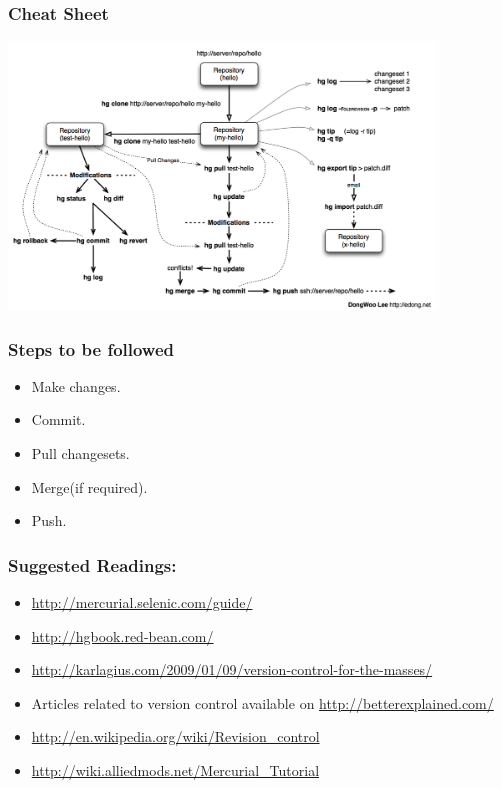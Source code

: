 \documentclass[14pt,compress]{beamer}
\newcounter{time}
\newcommand{\inctime}[1]{\addtocounter{time}{#1}{\tiny \thetime\ m}}
\begin{document}
\begin{frame}
  \frametitle{Cheat Sheet}
  \begin{center}
  \includegraphics[height=2.8in]{mod}  
  \end{center}  
\end{frame}

\begin{frame}
  \frametitle{Steps to be followed}
  \begin{itemize}
  \item Make changes.
  \item Commit.
  \item Pull changesets.
  \item Merge(if required).
  \item Push.
  \end{itemize}
  \inctime{10}
\end{frame}

\begin{frame}
  \frametitle{Suggested Readings:}
  \begin{itemize}
  \item \url{http://mercurial.selenic.com/guide/}
  \item \url{http://hgbook.red-bean.com/}    
  \item \url{http://karlagius.com/2009/01/09/version-control-for-the-masses/}
  \item Articles related to version control available on \url{http://betterexplained.com/}
  \item \url{http://en.wikipedia.org/wiki/Revision_control}
  \item \url{http://wiki.alliedmods.net/Mercurial_Tutorial}
  \end{itemize}
\end{frame}
\end{document}
